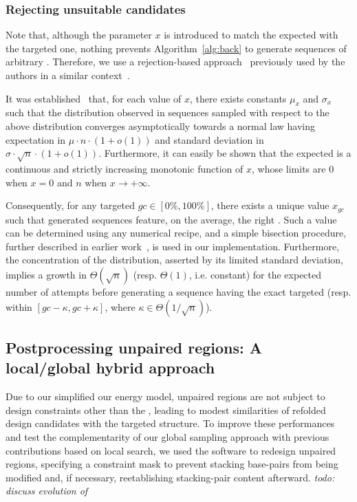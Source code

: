 \subsubsection{Rejecting unsuitable candidates}

Note that, although the parameter $x$ is introduced to match the expected \GCContent with the targeted one, nothing prevents Algorithm~\ref{alg:back} to generate sequences of arbitrary \GCContent. Therefore, we use a rejection-based approach~\cite{Bodini2010} previously used by the authors in a similar context~\cite{Waldispuhl2011}.

It was established~\cite{Waldispuhl2011} that, for each value of $x$, there exists constants $\mu_x$ and $\sigma_x$ such that the \GCContent distribution observed in sequences sampled with respect to the above distribution converges asymptotically towards a normal law having expectation in $\mu\cdot n\cdot(1+o(1))$ and standard deviation in $\sigma\cdot\sqrt{n}\cdot(1+o(1))$.
Furthermore, it can easily be shown that the expected \GCContent is a continuous and strictly increasing monotonic  function of $x$, whose limits are $0$ when $x=0$ and $n$ when $x\to +\infty$. 

Consequently, for any targeted \GCContent $gc\in[0\%,100\%]$, there exists a unique value $x_{gc}$ such that generated sequences feature, on the average, the right \GCContent. Such a value can be determined using any numerical recipe, and a simple bisection procedure, further described in earlier work~\cite{Waldispuhl2011}, is used in our implementation. Furthermore, the concentration of the distribution, asserted by its limited standard deviation, implies a growth in $\Theta(\sqrt{n})$ (resp. $\Theta(1)$, i.e. constant) for the expected number of attempts before generating a sequence having the exact targeted \GCContent  (resp. within $[gc-\kappa,gc+\kappa]$, where $\kappa\in\Theta(1/\sqrt n)$).



\subsection{Postprocessing unpaired regions: A local/global hybrid approach}
\label{subsec:glocal_method}
Due to our simplified our energy model, unpaired regions are not subject to design constraints other than the \GCContent, leading to modest similarities of refolded design candidates with the targeted structure. To improve these performances and test the complementarity  of our global sampling approach with previous contributions based on local search, we used the \RNAinverse software to redesign unpaired regions, specifying a constraint mask to prevent stacking base-pairs from being modified and, if necessary, reetablishing stacking-pair content afterward.
{\em todo: discuss evolution of \GCContent}



